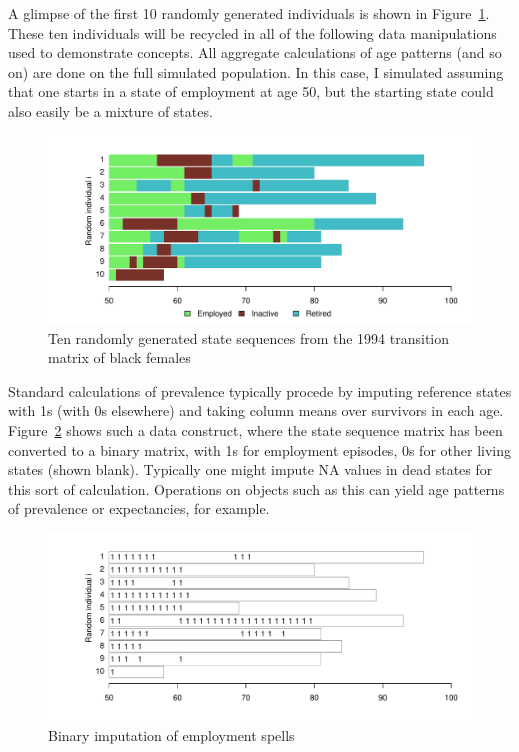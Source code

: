 \documentclass{article}
\begin{document}
A glimpse of the first 10 randomly generated individuals is shown in
Figure~\ref{fig:seq10}. These ten individuals will be recycled in all of the
following data manipulations used to demonstrate concepts. All aggregate
calculations of age patterns (and so on) are done on the full simulated population. In this case, I simulated
assuming that one starts in a state of employment at age 50, but the starting
state could also easily be a mixture of states.

\begin{figure}[ht!]
\centering
\caption{Ten randomly generated state sequences from the 1994 transition matrix
of black females \citep{Dudel2017}}
\label{fig:seq10}
\includegraphics[scale=.5]{Figures/Seq10.pdf}
\end{figure}

Standard calculations of prevalence typically procede by imputing reference
states with 1s (with 0s elsewhere) and taking column means over survivors in
each age. Figure~\ref{fig:seq10ones} shows such a data construct, where the
state sequence matrix has been converted to a binary matrix, with 1s for
employment episodes, 0s for other living states (shown blank). Typically one
might impute NA values in dead states for this sort of calculation. Operations on
objects such as this can yield age patterns of prevalence or
expectancies, for example.

 \begin{figure}[ht!]
\centering
\caption{Binary imputation of employment spells}
\label{fig:seq10ones}
\includegraphics[scale=.5]{Figures/Seq10ones.pdf}
\end{figure}
\end{document}
